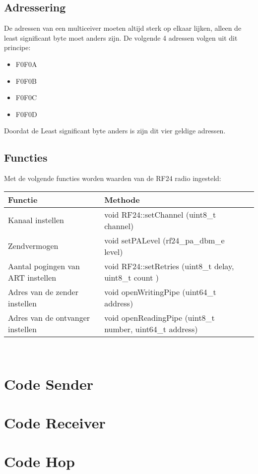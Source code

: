 \documentclass{article}
\begin{document}
\subsection{Adressering}
De adressen van een multiceiver moeten altijd sterk op elkaar lijken, alleen de least significant byte moet anders zijn. De volgende 4 adressen volgen uit dit principe:

\begin{itemize}
	\item  F0F0A
	\item  F0F0B
	\item  F0F0C
	\item  F0F0D
\end{itemize}
Doordat de Least significant byte anders is zijn dit vier geldige adressen.

\subsection{Functies}

Met de volgende functies worden waarden van de RF24 radio ingesteld:
\\
\begin{tabular}{ | l | l | p{5cm} |}
    \hline
    Functie				& Methode	\\ \hline
    Kanaal instellen	& void RF24::setChannel	(uint8\_t channel) 	\\ 
    Zendvermogen 		& void 	setPALevel (rf24\_pa\_dbm\_e level)	\\ 
    Aantal pogingen van ART instellen& void RF24::setRetries (uint8\_t delay, uint8\_t count )\\ 
    Adres van de zender instellen 	 & void	openWritingPipe (uint64\_t address)	\\
    Adres van de ontvanger instellen & void	openReadingPipe (uint8\_t number, uint64\_t address) \\ \hline
    \end{tabular}\\


\section{Code Sender}


\section{Code Receiver}


\section{Code Hop}

\end{document}
